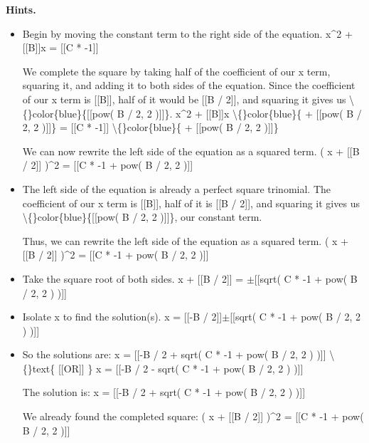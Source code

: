 \documentclass{article}
\begin{document}
\textbf{Hints.}
\begin{itemize}
  \item Begin by moving the constant term to the right side of the equation.
                    x\textasciicircum{}2  + [[B]]x = [[C * -1]]
                
                
                    We complete the square by taking half of the coefficient of our x term, squaring it, and adding it to both sides of the equation. Since the coefficient of our x term is [[B]], half of it would be [[B / 2]], and squaring it gives us \textbackslash\{\}color\{blue\}\{[[pow( B / 2, 2 )]]\}.
                    x\textasciicircum{}2 + [[B]]x \textbackslash\{\}color\{blue\}\{ + [[pow( B / 2, 2 )]]\} = [[C * -1]] \textbackslash\{\}color\{blue\}\{ + [[pow( B / 2, 2 )]]\}
                
                
                    We can now rewrite the left side of the equation as a squared term.
                    ( x + [[B / 2]] )\textasciicircum{}2 = [[C * -1 + pow( B / 2, 2 )]]
  \item The left side of the equation is already a perfect square trinomial. The coefficient of our x term is [[B]], half of it is [[B / 2]], and squaring it gives us \textbackslash\{\}color\{blue\}\{[[pow( B / 2, 2 )]]\}, our constant term.
                
                    Thus, we can rewrite the left side of the equation as a squared term.
                    ( x + [[B / 2]] )\textasciicircum{}2 = [[C * -1 + pow( B / 2, 2 )]]
  \item Take the square root of both sides.
                x  + [[B / 2]] = $\pm$[[sqrt( C * -1 + pow( B / 2, 2 ) )]]
  \item Isolate x to find the solution(s).
                x = [[-B / 2]]$\pm$[[sqrt( C * -1 + pow( B / 2, 2 ) )]]
  \item So the solutions are: x = [[-B / 2 + sqrt( C * -1 + pow( B / 2, 2 ) )]] \textbackslash\{\}text\{ [[OR]] \} x = [[-B / 2 - sqrt( C * -1 + pow( B / 2, 2 ) )]]
                
                
                    The solution is: x = [[-B / 2 + sqrt( C * -1 + pow( B / 2, 2 ) )]]
                
                We already found the completed square: ( x + [[B / 2]] )\textasciicircum{}2 = [[C * -1 + pow( B / 2, 2 )]]
\end{itemize}
\end{document}

